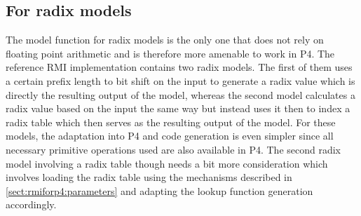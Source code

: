 \subsection{For radix models}
\label{sect:rmiforp4:radix}
The model function for radix models is the only one that does not rely on floating point arithmetic and is therefore more amenable to work in P4. The reference RMI implementation contains two radix models. The first of them uses a certain prefix length to bit shift on the input to generate a radix value which is directly the resulting output of the model, whereas the second model calculates a radix value based on the input the same way but instead uses it then to index a radix table which then serves as the resulting output of the model. For these models, the adaptation into P4 and code generation is even simpler since all necessary primitive operations used are also available in P4. The second radix model involving a radix table though needs a bit more consideration which involves loading the radix table using the mechanisms described in \ref{sect:rmiforp4:parameters} and adapting the lookup function generation accordingly.

\pagebreak

